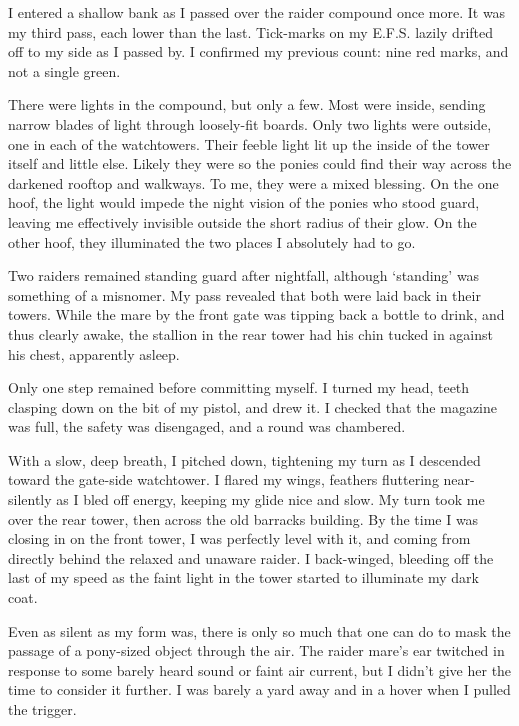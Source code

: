 I entered a shallow bank as I passed over the raider compound once more. It was my third pass, each lower than the last. Tick-marks on my E.F.S. lazily drifted off to my side as I passed by. I confirmed my previous count: nine red marks, and not a single green.

There were lights in the compound, but only a few. Most were inside, sending narrow blades of light through loosely-fit boards. Only two lights were outside, one in each of the watchtowers. Their feeble light lit up the inside of the tower itself and little else. Likely they were so the ponies could find their way across the darkened rooftop and walkways. To me, they were a mixed blessing. On the one hoof, the light would impede the night vision of the ponies who stood guard, leaving me effectively invisible outside the short radius of their glow. On the other hoof, they illuminated the two places I absolutely had to go.

Two raiders remained standing guard after nightfall, although ‘standing’ was something of a misnomer. My pass revealed that both were laid back in their towers. While the mare by the front gate was tipping back a bottle to drink, and thus clearly awake, the stallion in the rear tower had his chin tucked in against his chest, apparently asleep.

Only one step remained before committing myself. I turned my head, teeth clasping down on the bit of my pistol, and drew it. I checked that the magazine was full, the safety was disengaged, and a round was chambered.

With a slow, deep breath, I pitched down, tightening my turn as I descended toward the gate-side watchtower. I flared my wings, feathers fluttering near-silently as I bled off energy, keeping my glide nice and slow. My turn took me over the rear tower, then across the old barracks building. By the time I was closing in on the front tower, I was perfectly level with it, and coming from directly behind the relaxed and unaware raider. I back-winged, bleeding off the last of my speed as the faint light in the tower started to illuminate my dark coat.

Even as silent as my form was, there is only so much that one can do to mask the passage of a pony-sized object through the air. The raider mare’s ear twitched in response to some barely heard sound or faint air current, but I didn’t give her the time to consider it further. I was barely a yard away and in a hover when I pulled the trigger.

